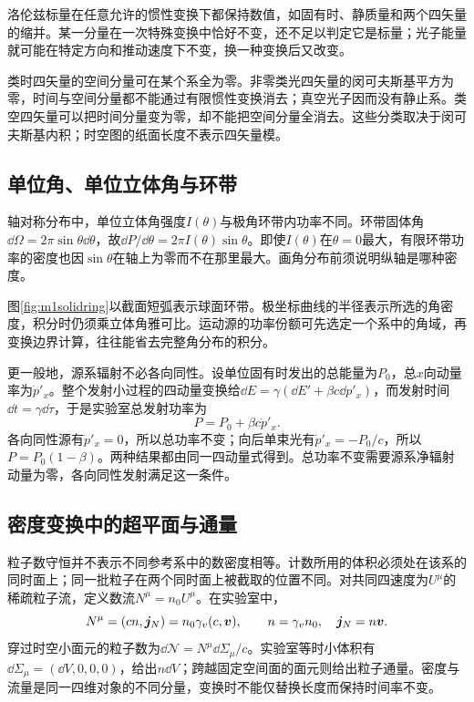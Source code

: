 洛伦兹标量在任意允许的惯性变换下都保持数值，如固有时、静质量和两个四矢量的缩并。某一分量在一次特殊变换中恰好不变，还不足以判定它是标量；光子能量就可能在特定方向和推动速度下不变，换一种变换后又改变。

类时四矢量的空间分量可在某个系全为零。非零类光四矢量的闵可夫斯基平方为零，时间与空间分量都不能通过有限惯性变换消去；真空光子因而没有静止系。类空四矢量可以把时间分量变为零，却不能把空间分量全消去。这些分类取决于闵可夫斯基内积；时空图的纸面长度不表示四矢量模。

\subsection{单位角、单位立体角与环带}
轴对称分布中，单位立体角强度$I(\theta)$与极角环带内功率不同。环带固体角$\dd\Omega=2\pi\sin\theta\dd\theta$，故$\dd P/\dd\theta=2\pi I(\theta)\sin\theta$。即使$I(\theta)$在$\theta=0$最大，有限环带功率的密度也因$\sin\theta$在轴上为零而不在那里最大。画角分布前须说明纵轴是哪种密度。

图\ref{fig:m1solidring}以截面短弧表示球面环带。极坐标曲线的半径表示所选的角密度，积分时仍须乘立体角雅可比。运动源的功率份额可先选定一个系中的角域，再变换边界计算，往往能省去完整角分布的积分。

更一般地，源系辐射不必各向同性。设单位固有时发出的总能量为$P_0$，总$x$向动量率为$\dot p'_x$。整个发射小过程的四动量变换给$\dd E=\gamma(\dd E'+\beta c\dd p'_x)$，而发射时间$\dd t=\gamma\dd\tau$，于是实验室总发射功率为
\[
 P=P_0+\beta c\dot p'_x.
\]
各向同性源有$\dot p'_x=0$，所以总功率不变；向后单束光有$\dot p'_x=-P_0/c$，所以$P=P_0(1-\beta)$。两种结果都由同一四动量式得到。总功率不变需要源系净辐射动量为零，各向同性发射满足这一条件。

\subsection{密度变换中的超平面与通量}
粒子数守恒并不表示不同参考系中的数密度相等。计数所用的体积必须处在该系的同时面上；同一批粒子在两个同时面上被截取的位置不同。对共同四速度为$U^\mu$的稀疏粒子流，定义数流$N^\mu=n_0U^\mu$。在实验室中，
\[
 N^\mu=(cn,\bm{j}_N)=n_0\gamma_v(c,\bm{v}),\qquad
 n=\gamma_vn_0,\quad \bm{j}_N=n\bm{v}.
\]
穿过时空小面元的粒子数为$\dd\mathcal N=N^\mu\dd\Sigma_\mu/c$。实验室等时小体积有$\dd\Sigma_\mu=(\dd V,0,0,0)$，给出$n\dd V$；跨越固定空间面的面元则给出粒子通量。密度与流量是同一四维对象的不同分量，变换时不能仅替换长度而保持时间率不变。

